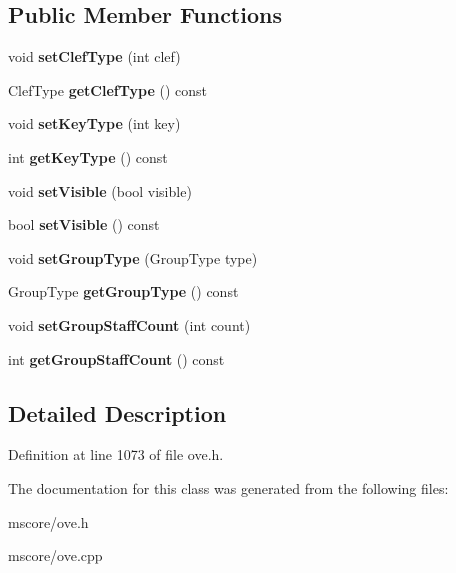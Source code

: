 \subsection*{Public Member Functions}
\begin{DoxyCompactItemize}
\item 
\mbox{\label{class_o_v_e_1_1_staff_a0143d08afab3cb7553aefbb394b77a04}} 
void {\bfseries set\+Clef\+Type} (int clef)
\item 
\mbox{\label{class_o_v_e_1_1_staff_a67ecd5658ebe977d5dc3b6e92ee4ae82}} 
Clef\+Type {\bfseries get\+Clef\+Type} () const
\item 
\mbox{\label{class_o_v_e_1_1_staff_a46d478ae5fa50c56f22e8a83a06472ac}} 
void {\bfseries set\+Key\+Type} (int key)
\item 
\mbox{\label{class_o_v_e_1_1_staff_a7fbcbb231112b93789078546c168a387}} 
int {\bfseries get\+Key\+Type} () const
\item 
\mbox{\label{class_o_v_e_1_1_staff_aa509b2aa68637444d7eb209687494930}} 
void {\bfseries set\+Visible} (bool visible)
\item 
\mbox{\label{class_o_v_e_1_1_staff_a577a2947a78c2f8c6dac2e223a6988ab}} 
bool {\bfseries set\+Visible} () const
\item 
\mbox{\label{class_o_v_e_1_1_staff_a2b62dfd694b208cad9cff0f64c4f0325}} 
void {\bfseries set\+Group\+Type} (Group\+Type type)
\item 
\mbox{\label{class_o_v_e_1_1_staff_a06633692d3194be1683f99aa3c128e81}} 
Group\+Type {\bfseries get\+Group\+Type} () const
\item 
\mbox{\label{class_o_v_e_1_1_staff_a4efcebe80e2f9fdb12d93659432590bc}} 
void {\bfseries set\+Group\+Staff\+Count} (int count)
\item 
\mbox{\label{class_o_v_e_1_1_staff_af7b1e8ede4a030e8f77769cd99d9a3fb}} 
int {\bfseries get\+Group\+Staff\+Count} () const
\end{DoxyCompactItemize}


\subsection{Detailed Description}


Definition at line 1073 of file ove.\+h.



The documentation for this class was generated from the following files\+:\begin{DoxyCompactItemize}
\item 
mscore/ove.\+h\item 
mscore/ove.\+cpp\end{DoxyCompactItemize}
